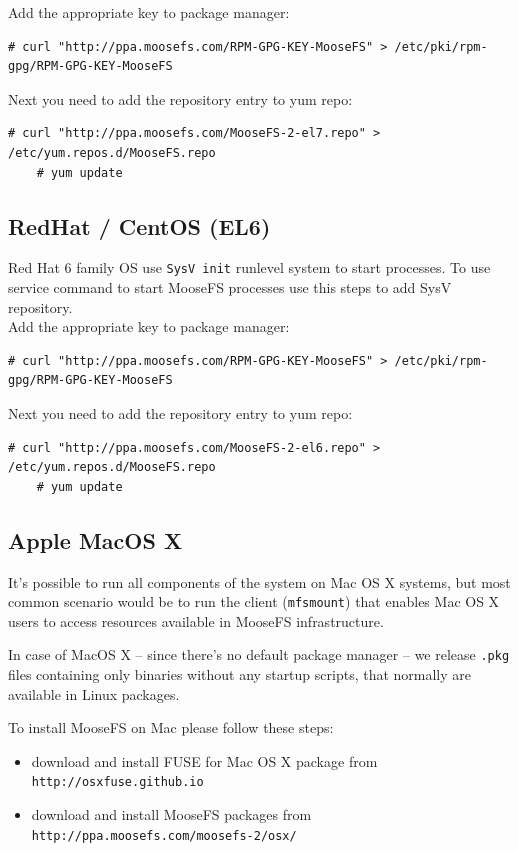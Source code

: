 \documentclass[a4paper,11pt,english]{report}
\def\code#1{\texttt{#1}}
\begin{document}
			Add the appropriate key to package manager:
			\begin{lstlisting}[caption={Adding the repo key}]
	# curl "http://ppa.moosefs.com/RPM-GPG-KEY-MooseFS" > /etc/pki/rpm-gpg/RPM-GPG-KEY-MooseFS
			\end{lstlisting}

			Next you need to add the repository entry to yum repo:
			\begin{lstlisting}[caption={Adding MooseFS repo}]
	# curl "http://ppa.moosefs.com/MooseFS-2-el7.repo" > /etc/yum.repos.d/MooseFS.repo
	# yum update
			\end{lstlisting}
			
			\subsection{RedHat / CentOS (EL6)}
			Red Hat 6 family OS use \code{SysV init} runlevel system to start processes. To use service command to start MooseFS processes use this steps to add SysV repository.\\
			Add the appropriate key to package manager:
			\begin{lstlisting}[caption={Adding the repo key}]
	# curl "http://ppa.moosefs.com/RPM-GPG-KEY-MooseFS" > /etc/pki/rpm-gpg/RPM-GPG-KEY-MooseFS
			\end{lstlisting}

			Next you need to add the repository entry to yum repo:
			\begin{lstlisting}[caption={Adding the MooseFS repo}]
	# curl "http://ppa.moosefs.com/MooseFS-2-el6.repo" > /etc/yum.repos.d/MooseFS.repo
	# yum update
			\end{lstlisting}


			\subsection{Apple MacOS X}
			It's possible to run all components of the system on Mac OS X systems, but most common scenario would be to run the client (\code{mfsmount}) that enables Mac OS X users to access resources available in MooseFS infrastructure.
			
			In case of MacOS X -- since there's no default package manager -- we release \code{.pkg} files containing only binaries without any startup scripts, that normally are available in Linux packages.
			
			To install MooseFS on Mac please follow these steps:

			\begin{itemize}
				\item download and install FUSE for Mac OS X package from \\
					\code{http://osxfuse.github.io}
				\item download and install MooseFS packages from \\
					\code{http://ppa.moosefs.com/moosefs-2/osx/}
			\end{itemize}
			
\end{document}
